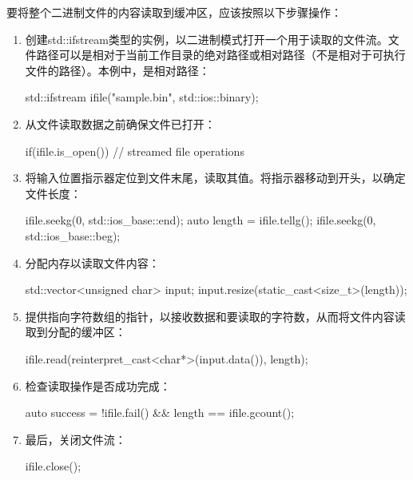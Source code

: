 要将整个二进制文件的内容读取到缓冲区，应该按照以下步骤操作：

\begin{enumerate}
\item
创建std::ifstream类型的实例，以二进制模式打开一个用于读取的文件流。文件路径可以是相对于当前工作目录的绝对路径或相对路径（不是相对于可执行文件的路径）。本例中，是相对路径：

\begin{cpp}
std::ifstream ifile("sample.bin", std::ios::binary);
\end{cpp}

\item
从文件读取数据之前确保文件已打开：

\begin{cpp}
if(ifile.is_open())
{
    // streamed file operations
}
\end{cpp}

\item
将输入位置指示器定位到文件末尾，读取其值。将指示器移动到开头，以确定文件长度：

\begin{cpp}
ifile.seekg(0, std::ios_base::end);
auto length = ifile.tellg();
ifile.seekg(0, std::ios_base::beg);
\end{cpp}

\item
分配内存以读取文件内容：

\begin{cpp}
std::vector<unsigned char> input;
input.resize(static_cast<size_t>(length));
\end{cpp}

\item
提供指向字符数组的指针，以接收数据和要读取的字符数，从而将文件内容读取到分配的缓冲区：

\begin{cpp}
ifile.read(reinterpret_cast<char*>(input.data()), length);
\end{cpp}

\item
检查读取操作是否成功完成：

\begin{cpp}
auto success = !ifile.fail() && length == ifile.gcount();
\end{cpp}

\item
最后，关闭文件流：

\begin{cpp}
ifile.close();
\end{cpp}
\end{enumerate}

